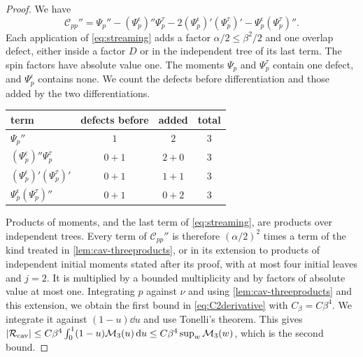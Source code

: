 \begin{proof}
We have
\[
 \mathcal C_{pp}''=\Psi_p''-(\Psi^\epsilon_p)''\Psi^\tau_p
 -2(\Psi^\epsilon_p)'(\Psi^\tau_p)'-\Psi^\epsilon_p(\Psi^\tau_p)''.
\]
Each application of \eqref{eq:streaming} adds a factor
$\alpha/2\le\beta^2/2$ and one overlap defect, either inside a factor $D$
or in the independent tree of its last term. The spin factors have
absolute value one. The moments $\Psi_p$ and $\Psi^\tau_p$ contain one
defect, and $\Psi^\epsilon_p$ contains none. We count the defects before
differentiation and those added by the two differentiations.
\begin{center}
\small
\begin{tabular}{@{}lccc@{}}
\toprule
term & defects before & added & total\\
\midrule
$\Psi_p''$ & $1$ & $2$ & $3$\\
$(\Psi^\epsilon_p)''\Psi^\tau_p$ & $0+1$ & $2+0$ & $3$\\
$(\Psi^\epsilon_p)'(\Psi^\tau_p)'$ & $0+1$ & $1+1$ & $3$\\
$\Psi^\epsilon_p(\Psi^\tau_p)''$ & $0+1$ & $0+2$ & $3$\\
\bottomrule
\end{tabular}
\end{center}
Products of moments, and the last term of \eqref{eq:streaming}, are
products over independent trees. Every term of $\mathcal C_{pp}''$ is
therefore $(\alpha/2)^2$ times a term of the kind treated in
\cref{lem:cav-threeproducts}, or in its extension to products of
independent initial moments stated after its proof, with at most four
initial leaves and $j=2$. It is multiplied by a bounded multiplicity and
by factors of absolute value at most one. Integrating $p$ against $\nu$
and using \cref{lem:cav-threeproducts} and this extension, we obtain the first bound in
\eqref{eq:C2derivative} with $C_\beta=C\beta^4$. We integrate it against
$(1-u)\dd u$ and use Tonelli's theorem. This gives
$|\mathcal R_{\rm cav}|\le C\beta^4\int_0^1(1-u)\mathcal M_3(u)\,\mathrm d u
\le C\beta^4\sup_w\mathcal M_3(w)$, which is the second bound.
\end{proof}
